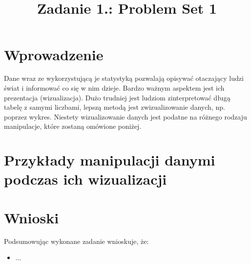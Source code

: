 \documentclass{classrep}
\author{%
    \studentinfo[239661@edu.p.lodz.pl]{Szymon Gruda}{239661}
}
\title{Zadanie 1.: Problem Set 1}
\begin{document}
    \maketitle
    \thispagestyle{fancyplain}

    \section{Wprowadzenie} {
        Dane wraz ze wykorzystującą je statystyką pozwalają opisywać otaczający ludzi świat i informować co się w nim dzieje. Bardzo ważnym aspektem jest ich prezentacja (wizualizacja). Dużo trudniej jest ludziom zinterpretować długą tabelę z samymi liczbami, lepszą metodą jest zwizualizowanie danych, np. poprzez wykres. Niestety wizualizowanie danych jest podatne na różnego rodzaju manipulacje, które zostaną omówione poniżej.
    }

    \section{Przykłady manipulacji danymi podczas ich wizualizacji} {

    }

    \section{Wnioski} {
        Podsumowując wykonane zadanie wnioskuje, że:
        \begin{itemize}
            \item ...

        \end{itemize}
    }

    \begin{thebibliography}{0}
    \end{thebibliography}
\end{document}
